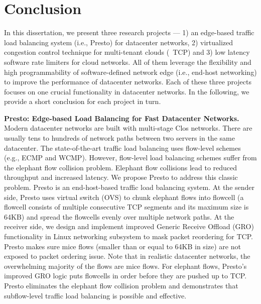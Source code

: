 
\section{Conclusion}

In this dissertation, we present three research projects --- 1) an edge-based traffic 
load balancing system (i.e., Presto) for datacenter networks, 2) virtualized congestion 
control technique for multi-tenant clouds (~\acdc TCP) and 3) low latency software rate 
limiters for cloud networks. All of them leverage the flexibility and high 
programmability of software-defined network edge (i.e., end-host networking) to improve 
the performance of datacenter networks. Each of these three projects focuses on one 
crucial functionality in datacenter networks. In the following, we provide a short 
conclusion for each project in turn.


{\bf Presto: Edge-based Load Balancing for Fast Datacenter Networks.} 
Modern datacenter networks are built with multi-stage Clos networks. There are 
usually tens to hundreds of network paths between two servers in the same datacenter.
The state-of-the-art traffic load balancing uses flow-level schemes (e.g., ECMP and WCMP). 
However, flow-level load balancing schemes suffer from the elephant flow collision problem. 
Elephant flow collisions lead to reduced throughput and increased latency. 
We propose Presto to address this classic problem. Presto is an end-host-based traffic 
load balancing system. At the sender side, Presto uses virtual switch (OVS) to 
chunk elephant flows into flowcell (a flowcell consists of multiple consecutive 
TCP segments and its maximum size is 64KB) and spread the flowcells evenly over 
multiple network paths. At the receiver side, we design and implement improved Generic 
Receive Offload (GRO) functionality in Linux networking subsystem to mask packet reordering for TCP. 
Presto makes sure mice flows (smaller than or equal to 64KB in size) are not exposed to packet 
ordering issue. Note that in realistic datacenter networks, the overwhelming majority of the 
flows are mice flows. For elephant flows, Presto's improved GRO logic puts flowcells in 
order before they are pushed up to TCP. Presto eliminates the elephant flow collision 
problem and demonstrates that subflow-level traffic load balancing is possible and effective. 


